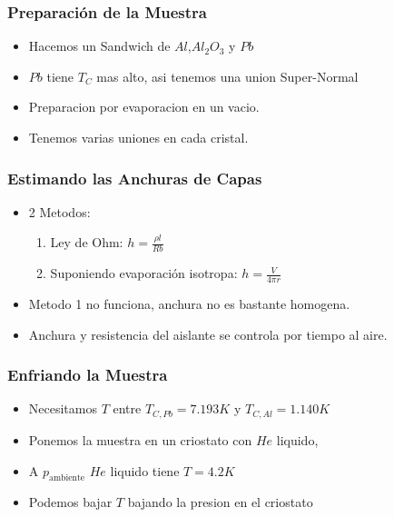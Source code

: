

\frame
{
  \frametitle{Preparaci\'on de la Muestra}
  
   \begin{itemize}
      \item<1-> Hacemos un Sandwich de $Al$,$Al_2O_3$ y $Pb$
      \item<2-> $Pb$ tiene $T_C$ mas alto, asi tenemos una union Super-Normal 
      \item<3-> Preparacion por evaporacion en un vacio.
      \item<4-> Tenemos varias  uniones en cada cristal.
  \end{itemize}
  
}




\frame
{
  \frametitle{Estimando las Anchuras de Capas}
  
  \begin{itemize}
     \item<1-> 2 Metodos:
        
        \begin{enumerate}
           \item<2-> Ley de Ohm: $h=\frac{\rho l}{Rb}$
           \item<3-> Suponiendo evaporaci\'on isotropa: $h=\frac{V}{4\pi r}$
        \end{enumerate}
        
     \item<4-> Metodo 1 no funciona, anchura no es bastante homogena.
     \item<5-> Anchura y resistencia del aislante se controla por tiempo al aire.
     
  \end{itemize}

  
 
}


\frame
{
  \frametitle{Enfriando la Muestra}
   \begin{itemize}
     \item<1->Necesitamos $T$ entre $T_{C,Pb}=7.193 K$ y $T_{C,Al}=1.140 K$
     \item<2->Ponemos la muestra en un criostato con $He$ liquido,
     \item<3->A $p_{\text{ambiente}}$ $He$ liquido tiene $T=4.2 K$
     \item<4->Podemos bajar $T$ bajando la presion en el criostato
   \end{itemize}
   
}

